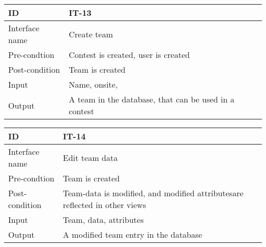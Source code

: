 \begin{longtable}{|l|p{}|}
\hline
ID & IT-13\\\hline
Interface name & Create team\\\hline
Pre-condtion & Contest is created, user is created\\\hline
Post-condition & Team is created\\\hline
Input & Name, onsite,\\\hline
Output & A team in the database, that can be used in a
contest\\\hline
\end{longtable}


\begin{longtable}{|l|p{}|}
\hline
ID & IT-14\\\hline
Interface name & Edit team data\\\hline
Pre-condtion & Team is created\\\hline
Post-condition & Team-data is modified, and modified attributesare reflected in
other views\\\hline
Input & Team, data, attributes\\\hline
Output & A modified team entry in the database\\\hline
\end{longtable}
